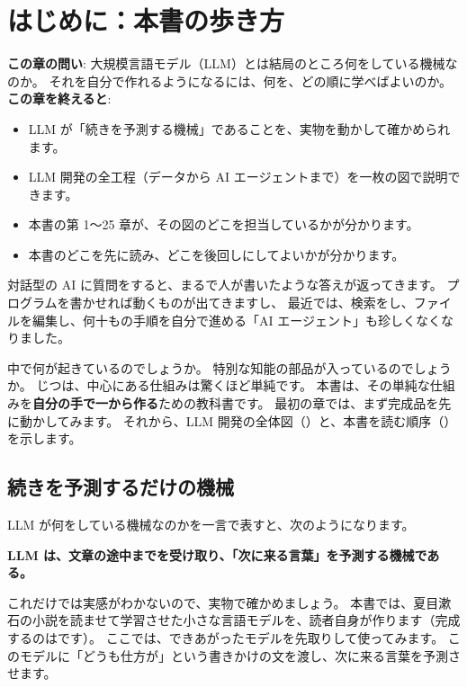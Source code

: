 \chapter{はじめに：本書の歩き方}\label{ch:intro}

\begin{chapterlead}
\textbf{この章の問い}: 大規模言語モデル（LLM）とは結局のところ何をしている機械なのか。
それを自分で作れるようになるには、何を、どの順に学べばよいのか。\\[1mm]
\textbf{この章を終えると}:
\begin{itemize}
\item LLM が「続きを予測する機械」であることを、実物を動かして確かめられます。
\item LLM 開発の全工程（データから AI エージェントまで）を一枚の図で説明できます。
\item 本書の第 1〜25 章が、その図のどこを担当しているかが分かります。
\item 本書のどこを先に読み、どこを後回しにしてよいかが分かります。
\end{itemize}
\end{chapterlead}

対話型の AI に質問をすると、まるで人が書いたような答えが返ってきます。
プログラムを書かせれば動くものが出てきますし、
最近では、検索をし、ファイルを編集し、何十もの手順を自分で進める「AI エージェント」も珍しくなくなりました。

中で何が起きているのでしょうか。
特別な知能の部品が入っているのでしょうか。
じつは、中心にある仕組みは驚くほど単純です。
本書は、その単純な仕組みを\textbf{自分の手で一から作る}ための教科書です。
最初の章では、まず完成品を先に動かしてみます。
それから、LLM 開発の全体図（）と、本書を読む順序（）を示します。

\section{続きを予測するだけの機械}\label{sec:intro-next-token}

LLM が何をしている機械なのかを一言で表すと、次のようになります。

\begin{center}
\textbf{LLM は、文章の途中までを受け取り、「次に来る言葉」を予測する機械である。}
\end{center}

これだけでは実感がわかないので、実物で確かめましょう。
本書では、夏目漱石の小説を読ませて学習させた小さな言語モデルを、読者自身が作ります（完成するのはです）。
ここでは、できあがったモデルを先取りして使ってみます。
このモデルに「どうも仕方が」という書きかけの文を渡し、次に来る言葉を予測させます。

